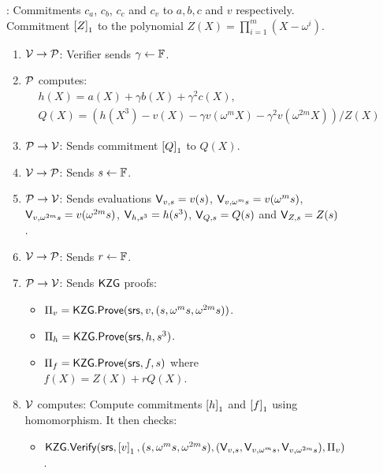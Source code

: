 \begin{figure}[htbp]
    \centering
    \begin{mdframed}
    {\footnotesize
    : Commitments $c_a$, $c_b$, $c_c$ and $c_v$ to $a,b,c$ and $v$ respectively. Commitment $\gone{Z}$ to the polynomial
        $Z(X)=\prod_{i=1}^m (X-\omega^i)$.
        \begin{enumerate}[leftmargin=2em]
            \item $\verifier\rightarrow\prover$: Verifier sends $\gamma\gets \F$.
            \item $\prover$ computes:
            \begin{align}
                & h(X) = a(X) + \gamma b(X) + \gamma^2 c(X),\\
                & Q(X) = (h(X^3) - v(X) - \gamma v(\omega^m X) - \gamma^2 v(\omega^{2m} X))/Z(X)
            \end{align}
            \item $\prover\rightarrow\verifier$: Sends commitment $\gone{Q}$ to $Q(X)$.
            \item $\verifier\rightarrow\prover$: Sends $s\gets\F$.
            \item $\prover\rightarrow\verifier$: Sends evaluations $\val{s}{v}=v(s)$, $\val{\omega^m s}{v}=v(\omega^m s)$,
            $\val{\omega^{2m}s}{v}=v(\omega^{2m} s)$, $\val{s^3}{h}=h(s^3)$, $\val{s}{Q}=Q(s)$ and $\val{s}{Z}=Z(s)$.
            \item $\verifier\rightarrow\prover$: Sends $r\gets\F$.
            \item $\prover\rightarrow\verifier$: Sends $\kzg$ proofs:
            \begin{itemize}[leftmargin=2em]
                \item $\Pi_v=\kzgprove(\srs,v,(s,\omega^m s, \omega^{2m}s))$.
                \item $\Pi_h=\kzgprove(\srs,h,s^3)$.
                \item $\Pi_f=\kzgprove(\srs,f,s)$ where $f(X)=Z(X) + rQ(X)$.
            \end{itemize}
            \item $\verifier$ computes: Compute commitments $\gone{h}$ and $\gone{f}$ using homomorphism. It then checks:
            \begin{itemize}[leftmargin=2em]
                \item $\kzgverify(\srs,\gone{v},(s,\omega^m s, \omega^{2m}s), (\val{s}{v}, \val{\omega^m s}{v}, \val{\omega^{2m} s}{v}),\Pi_v)$.

\end{itemize}
\end{enumerate}}
\end{mdframed}
\end{figure}
